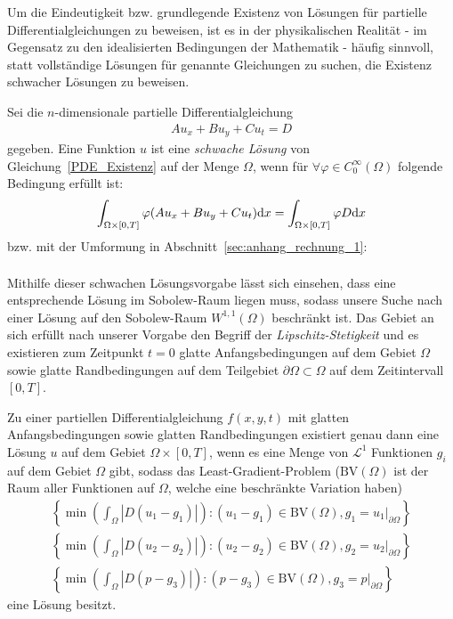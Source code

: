  Um die Eindeutigkeit bzw. grundlegende Existenz von Lösungen für partielle Differentialgleichungen zu beweisen, ist es in der physikalischen Realität - im Gegensatz zu den idealisierten Bedingungen der Mathematik - häufig sinnvoll, statt vollständige Lösungen für genannte Gleichungen zu suchen, die Existenz schwacher Lösungen zu beweisen.
\begin{Definitionbox}[]
    Sei die $n$-dimensionale partielle Differentialgleichung
    \begin{align}
    \label{PDE_Existenz}
        A u_{x} + B u_{y} + C u_{t} = D
    \end{align}
    gegeben. Eine Funktion $u$ ist eine \emph{schwache Lösung} von Gleichung~\eqref{PDE_Existenz} auf der Menge $\Omega$, wenn für $\forall \varphi \in C_0 ^{\infty} (\Omega)$ folgende Bedingung erfüllt ist:
    \begin{align*}
        \int_{\Omega\times [0,T]}{\varphi (A u_{x} + B u_{y} + C u_{t}) \text{d} x} = \int_{\Omega \times [0,T]}{\varphi D \text{d} x}
    \end{align*}
    bzw. mit der Umformung in Abschnitt~\ref{sec:anhang_rechnung_1}: %
    \begin{align*}
    \end{align*}
\end{Definitionbox}
Mithilfe dieser schwachen Lösungsvorgabe lässt sich einsehen, dass eine entsprechende Lösung im Sobolew-Raum liegen muss, sodass unsere Suche nach einer Lösung auf den Sobolew-Raum $W^{1,1}(\Omega)$ beschränkt ist. Das Gebiet an sich erfüllt nach unserer Vorgabe den Begriff der \emph{Lipschitz-Stetigkeit} und es existieren zum Zeitpunkt $t=0$ glatte Anfangsbedingungen auf dem Gebiet $\Omega$ sowie glatte Randbedingungen auf dem Teilgebiet $\partial\Omega \subset \Omega$ auf dem Zeitintervall $[0,T]$.
\begin{Theorembox}[]
    Zu einer partiellen Differentialgleichung $f(x,y,t)$ mit glatten Anfangsbedingungen sowie glatten Randbedingungen existiert genau dann eine Lösung $u$ auf dem Gebiet $\Omega \times [0,T]$, wenn es eine Menge von $\mathcal{L}^1$ Funktionen $g_i$ auf dem Gebiet $\Omega$ gibt, sodass das Least-Gradient-Problem ($\text{BV}(\Omega)$ ist der Raum aller Funktionen auf $\Omega$, welche eine beschränkte Variation haben)
    \begin{align}
    \label{eq:u1_lg}
        \left\{ \min\left(\int_{\Omega}{|D(u_1 -g_1)|} \right): (u_1 -g_1)\in \text{BV}(\Omega), g_1=\left.u_1 \right\lvert_{\partial\Omega} \right\} \\
    \label{eq:u2_lg}
        \left\{ \min\left(\int_{\Omega}{|D(u_2 -g_2)|} \right): (u_2 -g_2)\in \text{BV}(\Omega), g_2=\left.u_2 \right\lvert_{\partial\Omega} \right\} \\
    \label{eq:p_lg}
        \left\{ \min\left(\int_{\Omega}{|D(p -g_3)|} \right): (p -g_3)\in \text{BV}(\Omega), g_3=\left.p \right\lvert_{\partial\Omega} \right\} 
    \end{align}
    eine Lösung besitzt.
\end{Theorembox}
